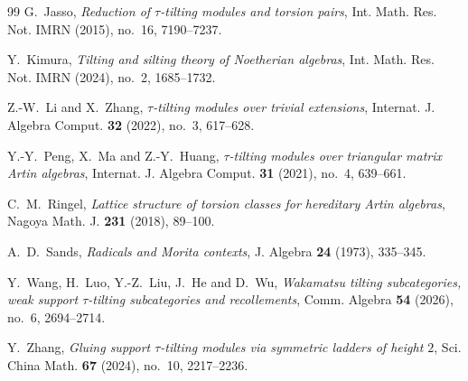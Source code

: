 \documentclass[11pt,reqno]{amsart}
\theoremstyle{definition}
\theoremstyle{remark}
\numberwithin{equation}{section}
\begin{document}
\begin{thebibliography}{99}
G.~Jasso,
\emph{Reduction of $\tau$-tilting modules and torsion pairs},
Int. Math. Res. Not. IMRN (2015), no.~16, 7190--7237.

Y.~Kimura,
\emph{Tilting and silting theory of Noetherian algebras},
Int. Math. Res. Not. IMRN (2024), no.~2, 1685--1732.

Z.-W.~Li and X.~Zhang,
\emph{$\tau$-tilting modules over trivial extensions},
Internat. J. Algebra Comput. \textbf{32} (2022), no.~3, 617--628.

Y.-Y.~Peng, X.~Ma and Z.-Y.~Huang,
\emph{$\tau$-tilting modules over triangular matrix Artin algebras},
Internat. J. Algebra Comput. \textbf{31} (2021), no.~4, 639--661.

C.~M.~Ringel,
\emph{Lattice structure of torsion classes for hereditary Artin algebras},
Nagoya Math. J. \textbf{231} (2018), 89--100.

A.~D.~Sands,
\emph{Radicals and Morita contexts},
J. Algebra \textbf{24} (1973), 335--345.

Y.~Wang, H.~Luo, Y.-Z.~Liu, J.~He and D.~Wu,
\emph{Wakamatsu tilting subcategories, weak support $\tau$-tilting
subcategories and recollements},
Comm. Algebra \textbf{54} (2026), no.~6, 2694--2714.

Y.~Zhang,
\emph{Gluing support $\tau$-tilting modules via symmetric ladders of
height $2$},
Sci. China Math. \textbf{67} (2024), no.~10, 2217--2236.

\end{thebibliography}

\enlargethispage{2\baselineskip}
\end{document}
